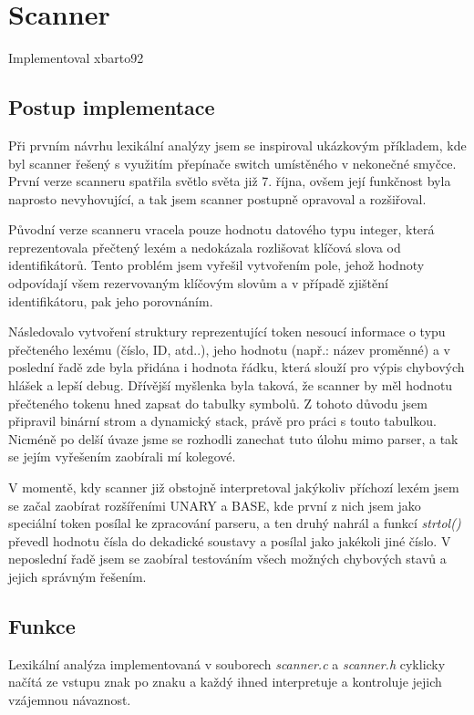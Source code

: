 \documentclass[11pt,a4paper]{article}
\begin{document}
\section{Scanner}
Implementoval xbarto92

	\subsection{Postup implementace}
	Při prvním návrhu lexikální analýzy jsem se inspiroval ukázkovým příkladem, kde byl scanner řešený s využitím přepínače switch umístěného v nekonečné smyčce. První verze scanneru spatřila světlo světa již 7. října, ovšem její funkčnost byla naprosto nevyhovující, a tak jsem scanner postupně opravoval a rozšiřoval.

	Původní verze scanneru vracela pouze hodnotu datového typu integer, která reprezentovala přečtený lexém a nedokázala rozlišovat klíčová slova od identifikátorů. Tento problém jsem vyřešil vytvořením pole, jehož hodnoty odpovídají všem rezervovaným klíčovým slovům a v případě zjištění identifikátoru, pak jeho porovnáním.

	Následovalo vytvoření struktury reprezentující token nesoucí informace o typu přečteného lexému (číslo, ID, atd..), jeho hodnotu (např.: název proměnné) a v poslední řadě zde byla přidána i hodnota řádku, která slouží pro výpis chybových hlášek a lepší debug. Dřívější myšlenka byla taková, že scanner by měl hodnotu přečteného tokenu hned zapsat do tabulky symbolů. Z tohoto důvodu jsem připravil binární strom a dynamický stack, právě pro práci s touto tabulkou. Nicméně po delší úvaze jsme se rozhodli zanechat tuto úlohu mimo parser, a tak se jejím vyřešením zaobírali mí kolegové.

	V momentě, kdy scanner již obstojně interpretoval jakýkoliv příchozí lexém jsem se začal zaobírat rozšířeními UNARY a BASE, kde první z nich jsem jako speciální token posílal ke zpracování parseru, a ten druhý nahrál a funkcí \emph{strtol()} převedl hodnotu čísla do dekadické soustavy a posílal jako jakékoli jiné číslo. V neposlední řadě jsem se zaobíral testováním všech možných chybových stavů a jejich správným řešením.

	\subsection{Funkce}
	Lexikální analýza implementovaná v souborech \emph{scanner.c} a \emph{scanner.h} cyklicky načítá ze vstupu znak po znaku a každý ihned interpretuje a kontroluje jejich vzájemnou návaznost.
\end{document}
